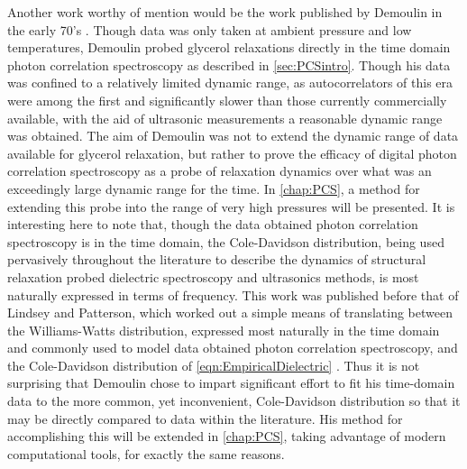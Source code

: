 Another work worthy of mention would be the work published by Demoulin in the early 70's \nolinebreak\cite{Demoulin}.  Though data was only taken at ambient pressure and low temperatures, Demoulin probed glycerol relaxations directly in the time domain \via photon correlation spectroscopy as described in \sect\nolinebreak \ref{sec:PCSintro}.  Though his data was confined to a relatively limited dynamic range, as autocorrelators of this era were among the first and significantly slower than those currently commercially available, with the aid of ultrasonic measurements a reasonable dynamic range was obtained.  The aim of Demoulin was not to extend the dynamic range of data available for glycerol relaxation, but rather to prove the efficacy of digital photon correlation spectroscopy as a probe of relaxation dynamics over what was an exceedingly large dynamic range for the time.  In \chap\nolinebreak \ref{chap:PCS}, a method for extending this probe into the range of very high pressures will be presented.  It is interesting here to note that, though the data obtained \via photon correlation spectroscopy is in the time domain, the Cole-Davidson distribution, being used pervasively throughout the literature to describe the dynamics of structural relaxation probed \via dielectric spectroscopy and ultrasonics methods, is most naturally expressed in terms of frequency.  This work was published before that of Lindsey and Patterson, which worked out a simple means of translating between the Williams-Watts distribution, expressed most naturally in the time domain and commonly used to model data obtained \via photon correlation spectroscopy, and the Cole-Davidson distribution of \eqn\nolinebreak \ref{eqn:EmpiricalDielectric} \nolinebreak\cite{Lindsey}.  Thus it is not surprising that Demoulin chose to impart significant effort to fit his time-domain data to the more common, yet inconvenient, Cole-Davidson distribution so that it may be directly compared to data within the literature.  His method for accomplishing this will be extended in  \chap \nolinebreak\ref{chap:PCS}, taking advantage of modern computational tools, for exactly the same reasons.


